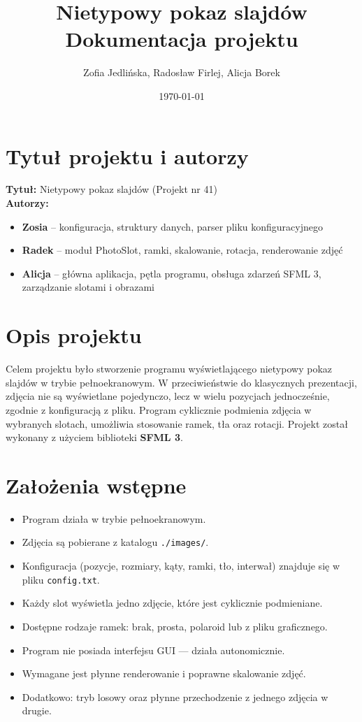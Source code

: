 \documentclass[12pt]{article}
\title{Nietypowy pokaz slajdów \\ \large Dokumentacja projektu}
\author{Zofia Jedlińska, Radosław Firlej, Alicja Borek}
\date{\today}
\begin{document}
\maketitle

\section{Tytuł projektu i autorzy}
\textbf{Tytuł:} Nietypowy pokaz slajdów (Projekt nr 41) \\
\textbf{Autorzy:}
\begin{itemize}
    \item \textbf{Zosia} – konfiguracja, struktury danych, parser pliku konfiguracyjnego
    \item \textbf{Radek} – moduł PhotoSlot, ramki, skalowanie, rotacja, renderowanie zdjęć
    \item \textbf{Alicja} – główna aplikacja, pętla programu, obsługa zdarzeń SFML 3, zarządzanie slotami i obrazami
\end{itemize}

\section{Opis projektu}
Celem projektu było stworzenie programu wyświetlającego nietypowy pokaz slajdów w trybie pełnoekranowym. W przeciwieństwie do klasycznych prezentacji, zdjęcia nie są wyświetlane pojedynczo, lecz w wielu pozycjach jednocześnie, zgodnie z konfiguracją z pliku. Program cyklicznie podmienia zdjęcia w wybranych slotach, umożliwia stosowanie ramek, tła oraz rotacji. Projekt został wykonany z użyciem biblioteki \textbf{SFML 3}.

\section{Założenia wstępne}
\begin{itemize}
    \item Program działa w trybie pełnoekranowym.
    \item Zdjęcia są pobierane z katalogu \texttt{./images/}.
    \item Konfiguracja (pozycje, rozmiary, kąty, ramki, tło, interwał) znajduje się w pliku \texttt{config.txt}.
    \item Każdy slot wyświetla jedno zdjęcie, które jest cyklicznie podmieniane.
    \item Dostępne rodzaje ramek: brak, prosta, polaroid lub z pliku graficznego.
    \item Program nie posiada interfejsu GUI — działa autonomicznie.
    \item Wymagane jest płynne renderowanie i poprawne skalowanie zdjęć.
    \item Dodatkowo: tryb losowy oraz płynne przechodzenie z jednego zdjęcia w drugie.
\end{itemize}
\end{document}
